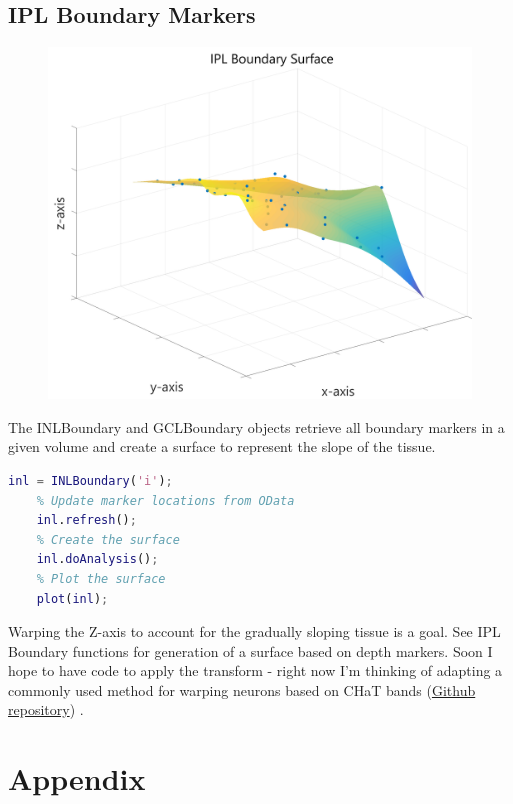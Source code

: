 \documentclass[12pt]{exam}
\begin{document}
	\subsection{IPL Boundary Markers}
	\begin{figure}
		\includegraphics[width=\linewidth]{iplboundary}
		\label{iplboundary}
	\end{figure} 
	The INLBoundary and GCLBoundary objects retrieve all boundary markers in a given volume and create a surface to represent the slope of the tissue.
	\begin{lstlisting}[language=matlab]
	inl = INLBoundary('i');
	% Update marker locations from OData
	inl.refresh();
	% Create the surface
	inl.doAnalysis();
	% Plot the surface
	plot(inl);\end{lstlisting}
	Warping the Z-axis to account for the gradually sloping tissue is a goal. See IPL Boundary functions for generation of a surface based on depth markers. Soon I hope to have code to apply the transform - right now I'm thinking of adapting a commonly used method for warping neurons based on CHaT bands (\href{https://github.com/uygarsumbul/rgc}{Github repository}) \cite{Sumbul2014}.
	\section{Appendix}
\end{document}
